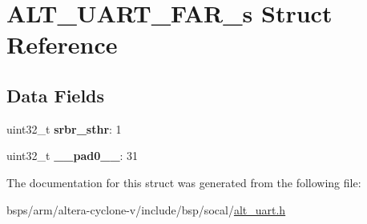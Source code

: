 \hypertarget{structALT__UART__FAR__s}{}\section{A\+L\+T\+\_\+\+U\+A\+R\+T\+\_\+\+F\+A\+R\+\_\+s Struct Reference}
\label{structALT__UART__FAR__s}
\subsection*{Data Fields}
\begin{DoxyCompactItemize}
\item 
\mbox{\label{structALT__UART__FAR__s_a280aa63e6d09590f84b3a5054f1b5c22}} 
uint32\+\_\+t {\bfseries srbr\+\_\+sthr}\+: 1
\item 
\mbox{\label{structALT__UART__FAR__s_ad1695edad220d1572e17d4c91b33d799}} 
uint32\+\_\+t {\bfseries \+\_\+\+\_\+pad0\+\_\+\+\_\+}\+: 31
\end{DoxyCompactItemize}


The documentation for this struct was generated from the following file\+:\begin{DoxyCompactItemize}
\item 
bsps/arm/altera-\/cyclone-\/v/include/bsp/socal/\mbox{\hyperlink{alt__uart_8h}{alt\+\_\+uart.\+h}}\end{DoxyCompactItemize}
